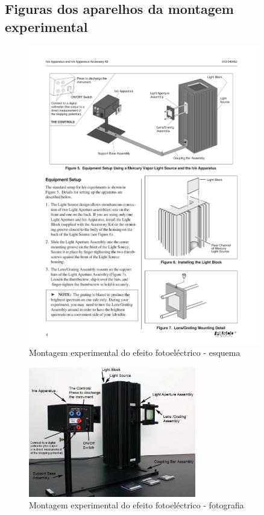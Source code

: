 \documentclass[12pt,a4paper,oneside]{paper}
\begin{document}
 \subsection{\sf Figuras dos aparelhos da montagem experimental}
 \begin{figure}[htb] 
	\centering 
	\includegraphics[width=0.9\textwidth]{./planck_images/planckPasco} 
	\caption{Montagem experimental do efeito fotoeléctrico - esquema} 
	\label{fig:plackPasco}
\end{figure}

 \begin{figure}[htb] 
	\centering 
	\includegraphics[width=0.65\textwidth]{./planck_images/Planck_setup} 
	\caption{Montagem experimental do efeito fotoeléctrico - fotografia} 
\end{figure}
\end{document}
